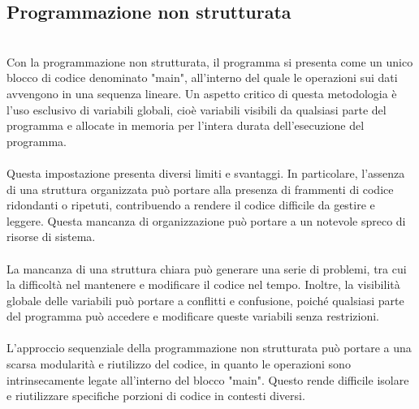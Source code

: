 \documentclass{report}
\begin{document}
\subsection{Programmazione non strutturata}
\\
Con la programmazione non strutturata, il programma si presenta come un unico blocco di codice denominato "main", all'interno del quale le operazioni sui dati avvengono in una sequenza lineare. Un aspetto critico di questa metodologia è l'uso esclusivo di variabili globali, cioè variabili visibili da qualsiasi parte del programma e allocate in memoria per l'intera durata dell'esecuzione del programma.
\\
\\
Questa impostazione presenta diversi limiti e svantaggi. In particolare, l'assenza di una struttura organizzata può portare alla presenza di frammenti di codice ridondanti o ripetuti, contribuendo a rendere il codice difficile da gestire e leggere. Questa mancanza di organizzazione può portare a un notevole spreco di risorse di sistema.
\\
\\
La mancanza di una struttura chiara può generare una serie di problemi, tra cui la difficoltà nel mantenere e modificare il codice nel tempo. Inoltre, la visibilità globale delle variabili può portare a conflitti e confusione, poiché qualsiasi parte del programma può accedere e modificare queste variabili senza restrizioni.
\\
\\
L'approccio sequenziale della programmazione non strutturata può portare a una scarsa modularità e riutilizzo del codice, in quanto le operazioni sono intrinsecamente legate all'interno del blocco "main". Questo rende difficile isolare e riutilizzare specifiche porzioni di codice in contesti diversi.
\\
\end{document}
